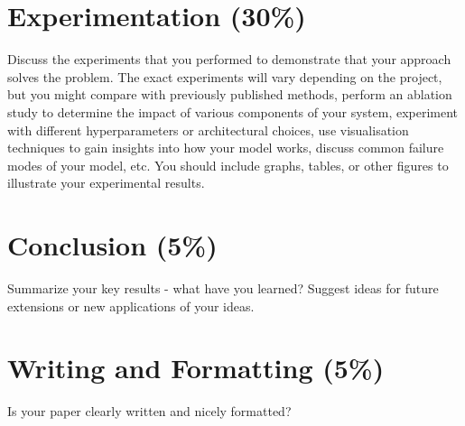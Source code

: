 \documentclass{article}
\begin{document}
\section{Experimentation (30\%)}

Discuss the experiments that you performed to demonstrate that your approach solves the problem. The exact experiments will vary depending on the project, but you might compare with previously published methods, perform an ablation study to determine the impact of various components of your system, experiment with different hyperparameters or architectural choices, use visualisation techniques to gain insights into how your model works, discuss common failure modes of your model, etc. You should include graphs, tables, or other figures to illustrate your experimental results.

\section{Conclusion (5\%)}

Summarize your key results - what have you learned? Suggest ideas for future extensions or new applications of your ideas.

\section{Writing and Formatting (5\%)}

Is your paper clearly written and nicely formatted? 
\end{document}
